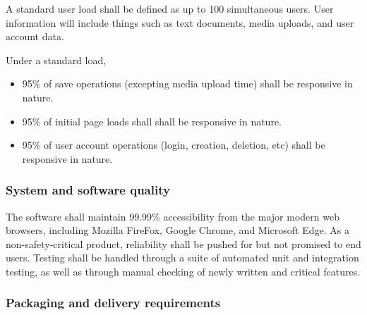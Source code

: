\documentclass[letterpaper, 10pt, draftclsnofoot, onecolumn]{IEEEtran}
\begin{document}
{{A standard user load shall be defined as up to 100 simultaneous users. User information
will include things such as text documents, media uploads, and user account data.

Under a standard load,
\begin{itemize}
  \item 95\% of save operations (excepting media upload time) shall be responsive in 
  nature.
  \item 95\% of initial page loads shall shall be responsive in 
  nature.
  \item 95\% of user account operations (login, creation, deletion, etc) shall be 
  responsive in nature.
\end{itemize}

\subsubsection[System and software
quality]{\rmfamily\bfseries\color{black} System
and software quality}

The software shall maintain 99.99\% accessibility from the major modern web browsers, including Mozilla FireFox, Google Chrome, and Microsoft Edge.
As a non-safety-critical product, reliability shall be pushed for but not promised
to end users. Testing shall be handled through a suite of automated unit and integration testing, as well as
through manual checking of newly written and critical features.

\subsubsection[Packaging and delivery
requirements]{\rmfamily\bfseries\color{black}
Packaging and delivery requirements}


}}
\end{document}
